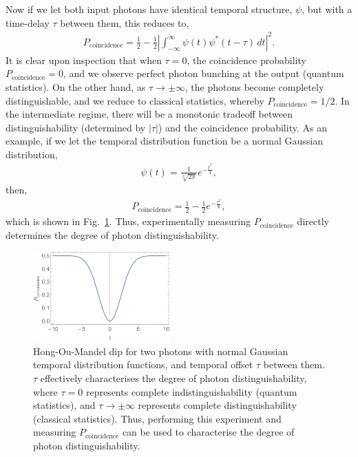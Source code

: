 Now if we let both input photons have identical temporal structure, $\psi$, but with a time-delay $\tau$ between them, this reduces to,
\begin{align}
P_\text{coincidence} = \frac{1}{2} - \frac{1}{2} \left| \int^\infty_{-\infty} \psi(t)\psi^*(t-\tau)\,dt\right|^2.
\end{align}
It is clear upon inspection that when \mbox{$\tau=0$}, the coincidence probability \mbox{$P_\text{coincidence}=0$}, and we observe perfect photon bunching at the output (quantum statistics). On the other hand, as \mbox{$\tau\to\pm\infty$}, the photons become completely distinguishable, and we reduce to classical statistics, whereby \mbox{$P_\text{coincidence}=1/2$}. In the intermediate regime, there will be a monotonic tradeoff between distinguishability (determined by $|\tau|$) and the coincidence probability. As an example, if we let the temporal distribution function be a normal Gaussian distribution,
\begin{align}
\psi(t) = \frac{1}{\sqrt[4]{2\pi}}e^{-\frac{t^2}{4}},
\end{align}
then,
\begin{align}
P_\text{coincidence} = \frac{1}{2} - \frac{1}{2} e^{-\frac{\tau^2}{8}},
\end{align}
which is shown in Fig.~\ref{fig:HOM_dip}. Thus, experimentally measuring $P_\text{coincidence}$ directly determines the degree of photon distinguishability.

\begin{figure}[!htb]
\includegraphics[width=0.47\textwidth]{HOM_dip}
\caption{Hong-Ou-Mandel dip for two photons with normal Gaussian temporal distribution functions, and temporal offset $\tau$ between them. $\tau$ effectively characterises the degree of photon distinguishability, where \mbox{$\tau=0$} represents complete indistinguishability (quantum statistics), and \mbox{$\tau\to\pm\infty$} represents complete distinguishability (classical statistics). Thus, performing this experiment and measuring $P_\text{coincidence}$ can be used to characterise the degree of photon distinguishability.} \label{fig:HOM_dip}
\end{figure}

